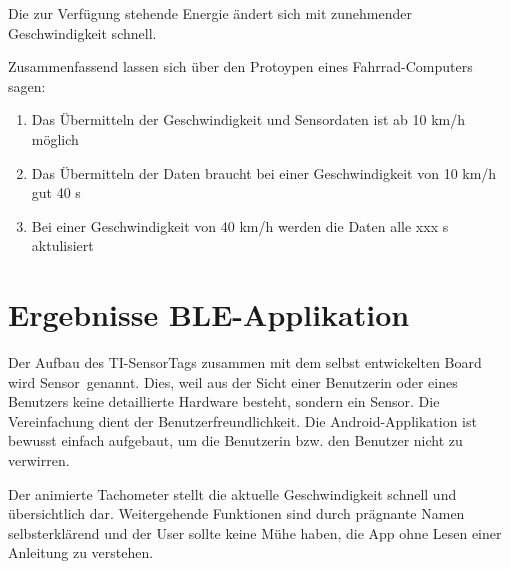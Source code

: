 Die zur Verfügung stehende Energie ändert sich mit zunehmender Geschwindigkeit schnell.

Zusammenfassend lassen sich über den Protoypen eines Fahrrad-Computers sagen:


\begin{minipage}{\textwidth}
    \begin{enumerate}
    \item Das Übermitteln der Geschwindigkeit und Sensordaten ist ab 10 km/h möglich
    \item Das Übermitteln der Daten braucht bei einer Geschwindigkeit von 10 km/h gut 40 s
    \item Bei einer Geschwindigkeit von 40 km/h werden die Daten alle xxx s aktulisiert
    \end{enumerate}
\end{minipage}


%
%


\section{Ergebnisse BLE-Applikation}

Der Aufbau des TI-SensorTags zusammen mit dem selbst entwickelten Board wird \glqq Sensor\grqq\thinspace\ genannt. Dies, weil aus der Sicht einer Benutzerin oder eines Benutzers keine detaillierte Hardware besteht, sondern \glqq ein Sensor\grqq. Die Vereinfachung dient der Benutzerfreundlichkeit. Die Android-Applikation ist bewusst einfach aufgebaut, um die Benutzerin bzw. den Benutzer nicht zu verwirren. 

Der animierte Tachometer stellt die aktuelle Geschwindigkeit schnell und übersichtlich dar. Weitergehende Funktionen sind durch prägnante Namen selbsterklärend und der User sollte keine Mühe haben, die App ohne Lesen einer Anleitung zu verstehen.


